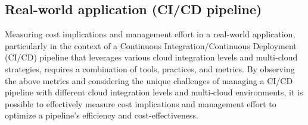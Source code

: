 
\subsection{Real-world application (CI/CD pipeline)}

Measuring cost implications and management effort in a real-world application, 
particularly in the context of a Continuous Integration/Continuous Deployment (CI/CD) pipeline 
that leverages various cloud integration levels and multi-cloud strategies, 
requires a combination of tools, practices, and metrics.
By observing the above metrics and considering the unique challenges of 
managing a CI/CD pipeline with different cloud integration levels 
and multi-cloud environments, 
it is possible to effectively measure cost implications and management effort 
to optimize a pipeline's efficiency and cost-effectiveness.

